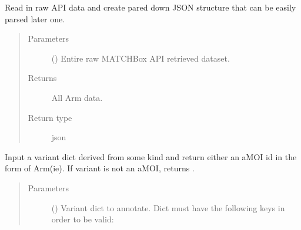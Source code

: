 \documentclass[letterpaper,10pt,english]{sphinxmanual}
\begin{document}
\begin{fulllineitems}
\begin{fulllineitems}
Read in raw API data and create pared down JSON structure that can be
easily parsed later one.
\begin{quote}\begin{description}
\item[{Parameters}] \leavevmode
{} () \textendash{} Entire raw MATCHBox API retrieved dataset.

\item[{Returns}] \leavevmode
All Arm data.

\item[{Return type}] \leavevmode
json

\end{description}\end{quote}

\end{fulllineitems}


\begin{fulllineitems}
\label{\detokenize{matchbox_api_utils:matchbox_api_utils.match_arms.TreatmentArms.map_amoi}}
Input a variant dict derived from some kind and return either an aMOI id
in the form of Arm(i\textbar{}e). If variant is not an aMOI, returns .
\begin{quote}\begin{description}
\item[{Parameters}] \leavevmode
{} () \textendash{} 
Variant dict to annotate.  Dict must have the
following keys in order to be valid:

%
\begin{sphinxVerbatim}[commandchars=\\\{\}]
   \PYG{p}{[}  \PYG{p}{]}
 
 
     
 
 
\end{sphinxVerbatim}


\end{description}
\end{quote}
\end{fulllineitems}
\end{fulllineitems}
\end{document}
